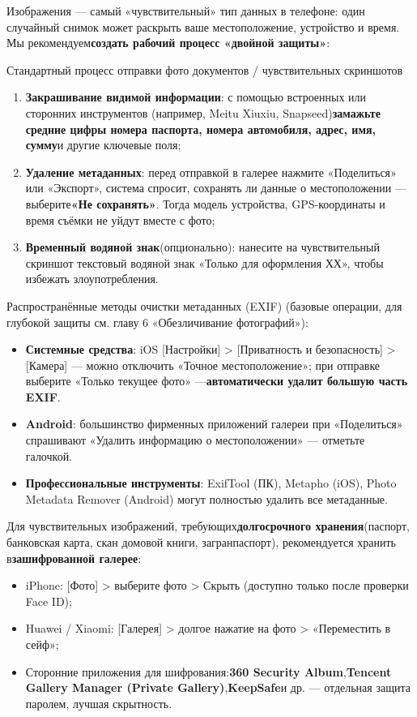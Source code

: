 Изображения — самый «чувствительный» тип данных в телефоне: один случайный снимок может раскрыть ваше местоположение, устройство и время. Мы рекомендуем\textbf{создать рабочий процесс «двойной защиты»}:

\begin{tcbwarn}{Стандартный процесс отправки фото документов / чувствительных скриншотов}
\begin{enumerate}
  \item \textbf{Закрашивание видимой информации}: с помощью встроенных или сторонних инструментов (например, Meitu Xiuxiu, Snapseed)\textbf{замажьте средние цифры номера паспорта, номера автомобиля, адрес, имя, сумму}и другие ключевые поля;
  \item \textbf{Удаление метаданных}: перед отправкой в галерее нажмите «Поделиться» или «Экспорт», система спросит, сохранять ли данные о местоположении — выберите\textbf{«Не сохранять»}. Тогда модель устройства, GPS-координаты и время съёмки не уйдут вместе с фото;
  \item \textbf{Временный водяной знак}(опционально): нанесите на чувствительный скриншот текстовый водяной знак «Только для оформления ХХ», чтобы избежать злоупотребления.
\end{enumerate}

\end{tcbwarn}

Распространённые методы очистки метаданных (EXIF) (базовые операции, для глубокой защиты см. главу 6 «Обезличивание фотографий»):

\begin{itemize}
  \item \textbf{Системные средства}: iOS [Настройки] > [Приватность и безопасность] > [Камера] — можно отключить «Точное местоположение»; при отправке выберите «Только текущее фото» —\textbf{автоматически удалит большую часть EXIF}.
  \item \textbf{Android}: большинство фирменных приложений галереи при «Поделиться» спрашивают «Удалить информацию о местоположении» — отметьте галочкой.
  \item \textbf{Профессиональные инструменты}: ExifTool (ПК), Metapho (iOS), Photo Metadata Remover (Android) могут полностью удалить все метаданные.
\end{itemize}

Для чувствительных изображений, требующих\textbf{долгосрочного хранения}(паспорт, банковская карта, скан домовой книги, загранпаспорт), рекомендуется хранить в\textbf{зашифрованной галерее}:

\begin{itemize}
  \item iPhone: [Фото] > выберите фото > Скрыть (доступно только после проверки Face ID);
  \item Huawei / Xiaomi: [Галерея] > долгое нажатие на фото > «Переместить в сейф»;
  \item Сторонние приложения для шифрования:\textbf{360 Security Album},\textbf{Tencent Gallery Manager (Private Gallery)},\textbf{KeepSafe}и др. — отдельная защита паролем, лучшая скрытность.
\end{itemize}

